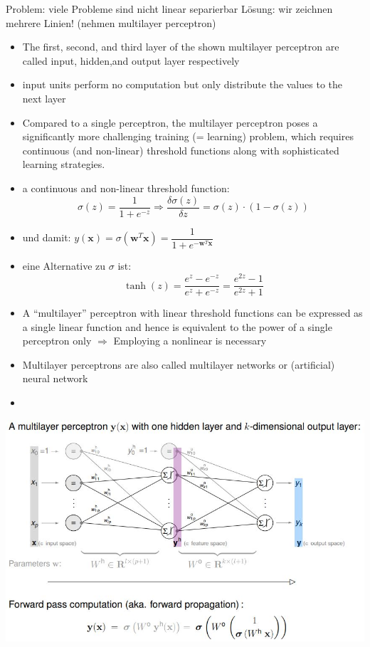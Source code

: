 \documentclass[11pt,a4paper]{article}
\begin{document}
\begin{flushleft}
Problem: viele Probleme sind nicht linear separierbar
Lösung: wir zeichnen mehrere Linien! (nehmen multilayer perceptron)
\begin{itemize}
\item The first, second, and third layer of the shown multilayer perceptron are called input, hidden,and output layer respectively
\item  input units perform no computation but only distribute the values to the next
layer
\item Compared to a single perceptron, the multilayer perceptron poses a significantly more
challenging training (= learning) problem, which requires continuous (and non-linear)
threshold functions along with sophisticated learning strategies.
\item a continuous and non-linear threshold function: 
$$ \sigma(z) = \frac{1}{1+ e^{-z}} \Rightarrow \frac{\delta \sigma (z)}{\delta z} = \sigma(z) \cdot (1- \sigma(z)) $$
\item und damit: $ y(\textbf{x}) = \sigma (\textbf{w}^T\textbf{x}) = \dfrac{1}{1+e^{-\textbf{w}^T\textbf{x}}} $
\item eine Alternative zu $\sigma$ ist: \\
$$ \tanh (z) = \frac{e^z - e^{-z}}{e^z + e^{-z}} = \frac{e^{2z}-1}{e^{2z}+1}$$ 
\item A “multilayer” perceptron with linear threshold functions can be expressed as a single linear
function and hence is equivalent to the power of a single perceptron only $\Rightarrow$ Employing a nonlinear is necessary
\item  Multilayer perceptrons are also called multilayer networks or (artificial) neural network
\item 
\end{itemize}
\includegraphics[width= \textwidth]{MP}

\end{flushleft}
\end{document}

